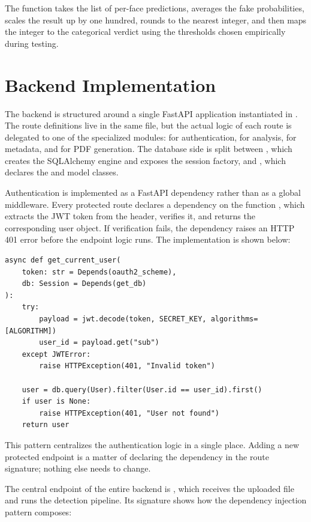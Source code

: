 The function takes the list of per-face predictions, averages the fake probabilities, scales the result up by one hundred, rounds to the nearest integer, and then maps the integer to the categorical verdict using the thresholds chosen empirically during testing.

\section{Backend Implementation}

The backend is structured around a single FastAPI application instantiated in . The route definitions live in the same file, but the actual logic of each route is delegated to one of the specialized modules:  for authentication,  for analysis,  for metadata, and  for PDF generation. The database side is split between , which creates the SQLAlchemy engine and exposes the session factory, and , which declares the  and  model classes.

Authentication is implemented as a FastAPI dependency rather than as a global middleware. Every protected route declares a dependency on the function , which extracts the JWT token from the  header, verifies it, and returns the corresponding user object. If verification fails, the dependency raises an HTTP 401 error before the endpoint logic runs. The implementation is shown below:

\begin{verbatim}
async def get_current_user(
    token: str = Depends(oauth2_scheme),
    db: Session = Depends(get_db)
):
    try:
        payload = jwt.decode(token, SECRET_KEY, algorithms=[ALGORITHM])
        user_id = payload.get("sub")
    except JWTError:
        raise HTTPException(401, "Invalid token")

    user = db.query(User).filter(User.id == user_id).first()
    if user is None:
        raise HTTPException(401, "User not found")
    return user
\end{verbatim}

This pattern centralizes the authentication logic in a single place. Adding a new protected endpoint is a matter of declaring the dependency in the route signature; nothing else needs to change.

The central endpoint of the entire backend is , which receives the uploaded file and runs the detection pipeline. Its signature shows how the dependency injection pattern composes:


